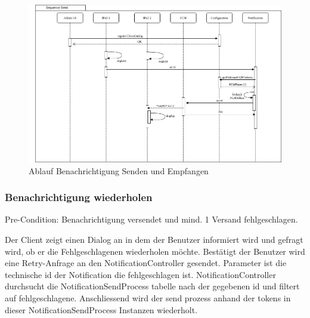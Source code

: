 \begin{figure}[h]
    \centering
    \begin{minipage}[b]{0.9\textwidth}
        \includegraphics[width=\textwidth]{graphics/Sequence_Notification_Send}
        \caption{Ablauf Benachrichtigung Senden und Empfangen}
    \end{minipage}
\end{figure}


\clearpage
\subsubsection*{Benachrichtigung wiederholen}

Pre-Condition: Benachrichtigung versendet und mind. 1 Versand fehlgeschlagen.

Der Client zeigt einen Dialog an in dem der Benutzer informiert wird und gefragt wird, ob er die Fehlgeschlagenen wiederholen möchte.
Bestätigt der Benutzer wird eine Retry-Anfrage an den NotificationController gesendet.
Parameter ist die technische id der Notification die fehlgeschlagen ist.
NotificationController durchsucht die NotificationSendProcess tabelle nach der gegebenen id und filtert auf fehlgeschlagene.
Anschliessend wird der send prozess anhand der tokens in dieser NotificationSendProcess Instanzen wiederholt.


